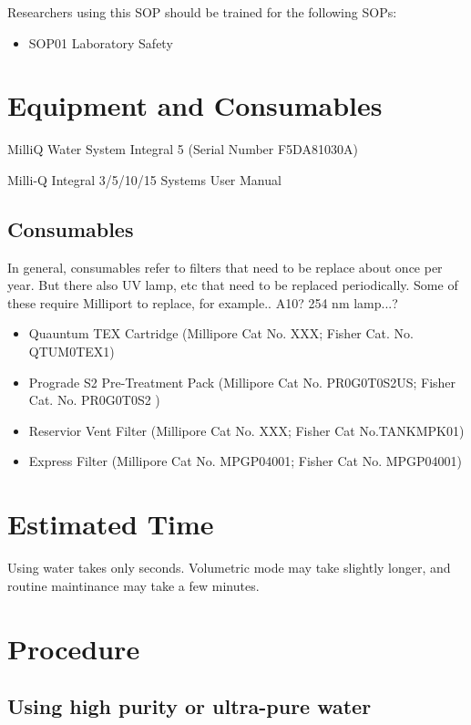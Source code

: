 \documentclass[12pt]{../SOP3_beta}\usepackage[]{graphicx}\usepackage[]{color}
\begin{document}
\NP Researchers using this SOP should be trained for the following SOPs:

\begin{itemize}
  \item SOP01 Laboratory Safety
\end{itemize}

\section{Equipment and Consumables}

\NP MilliQ Water System Integral 5 (Serial Number F5DA81030A)

\NP Milli-Q Integral 3/5/10/15 Systems User Manual

\subsection{Consumables}

In general, consumables refer to filters that need to be replace about once per year. But there also UV lamp, etc that need to be replaced periodically. Some of these require Milliport to replace, for example.. A10?  254 nm lamp...? 

\begin{itemize}
  \item Quauntum TEX Cartridge (Millipore Cat No. XXX; Fisher Cat. No. QTUM0TEX1)
  \item Prograde S2 Pre-Treatment Pack (Millipore Cat No. PR0G0T0S2US; Fisher Cat. No. PR0G0T0S2 ) 
  \item Reservior Vent Filter (Millipore Cat No. XXX; Fisher Cat No.TANKMPK01)
  \item Express Filter (Millipore Cat No. MPGP04001; Fisher Cat No. MPGP04001)
\end{itemize}


\section{Estimated Time}

\NP Using water takes only seconds. Volumetric mode may take slightly longer, and routine maintinance may take a few minutes. 

\section{Procedure}

\subsection{Using high purity or ultra-pure water}
\end{document}
